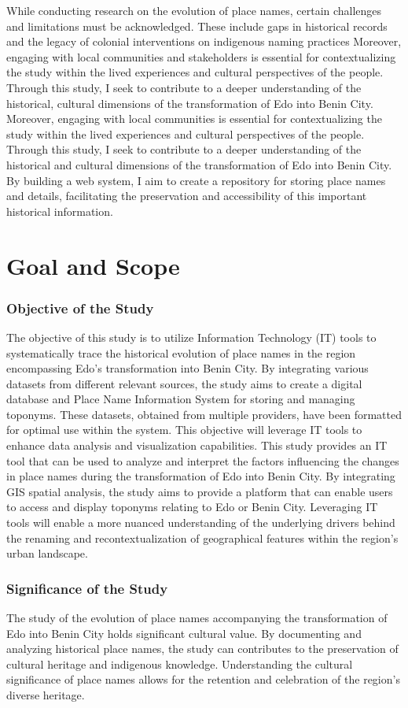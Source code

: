 While conducting research on the evolution of place names, certain challenges and limitations must be acknowledged. These include gaps in historical records and the legacy of colonial interventions on indigenous naming practices Moreover, engaging with local communities and stakeholders is essential for contextualizing the study within the lived experiences and cultural perspectives of the people.
Through this study, I seek to contribute to a deeper understanding of the historical, cultural dimensions of the transformation of Edo into Benin City. Moreover, engaging with local communities is essential for contextualizing the study within the lived experiences and cultural perspectives of the people. Through this study, I seek to contribute to a deeper understanding of the historical and cultural dimensions of the transformation of Edo into Benin City. By building a web system, I aim to create a repository for storing place names and details, facilitating the preservation and accessibility of this important historical information.

\section{Goal and Scope}
\subsubsection{Objective of the Study}
The objective of this study is to utilize Information Technology (IT) tools to systematically trace the historical evolution of place names in the region encompassing Edo's transformation into Benin City. By integrating various datasets from different relevant sources, the study aims to create a digital database and Place Name Information System for storing and managing toponyms. These datasets, obtained from multiple providers, have been formatted for optimal use within the system. This objective will leverage IT tools to enhance data analysis and visualization capabilities.
This study provides an IT tool that can be used to analyze and interpret the factors influencing the changes in place names during the transformation of Edo into Benin City. By integrating GIS spatial analysis, the study aims to provide a platform that can enable users to access and display toponyms relating to Edo or Benin City. Leveraging IT tools will enable a more nuanced understanding of the underlying drivers behind the renaming and recontextualization of geographical features within the region's urban landscape.
\subsubsection{Significance of the Study}
The study of the evolution of place names accompanying the transformation of Edo into Benin City holds significant cultural value. By documenting and analyzing historical place names, the study can contributes to the preservation of cultural heritage and indigenous knowledge. Understanding the cultural significance of place names allows for the retention and celebration of the region's diverse heritage. 

